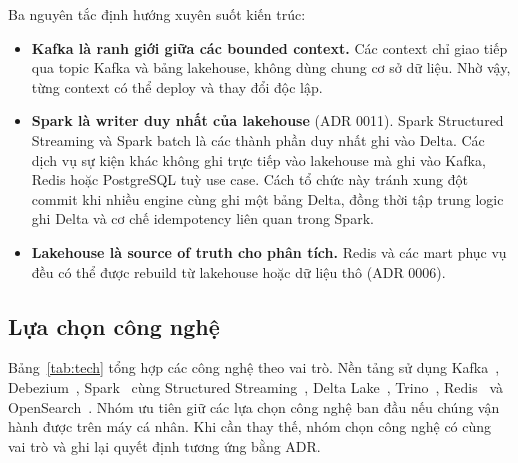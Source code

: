 Ba nguyên tắc định hướng xuyên suốt kiến trúc:
\begin{itemize}
  \item \textbf{Kafka là ranh giới giữa các bounded context.} Các context chỉ giao tiếp qua topic Kafka và bảng lakehouse, không dùng chung cơ sở dữ liệu. Nhờ vậy, từng context có thể deploy và thay đổi độc lập.
  \item \textbf{Spark là writer duy nhất của lakehouse} (ADR 0011). Spark Structured Streaming và Spark batch là các thành phần duy nhất ghi vào Delta. Các dịch vụ sự kiện khác không ghi trực tiếp vào lakehouse mà ghi vào Kafka, Redis hoặc PostgreSQL tuỳ use case. Cách tổ chức này tránh xung đột commit khi nhiều engine cùng ghi một bảng Delta, đồng thời tập trung logic ghi Delta và cơ chế idempotency liên quan trong Spark.
  \item \textbf{Lakehouse là source of truth cho phân tích.} Redis và các mart phục vụ đều có thể được rebuild từ lakehouse hoặc dữ liệu thô (ADR 0006).
\end{itemize}

\subsection{Lựa chọn công nghệ}

Bảng~\ref{tab:tech} tổng hợp các công nghệ theo vai trò. Nền tảng sử dụng Kafka~\cite{kreps2011kafka}, Debezium~\cite{debezium}, Spark~\cite{zaharia2016spark} cùng Structured Streaming~\cite{armbrust2018structured}, Delta Lake~\cite{armbrust2020delta}, Trino~\cite{sethi2019presto}, Redis~\cite{redis} và OpenSearch~\cite{opensearch}. Nhóm ưu tiên giữ các lựa chọn công nghệ ban đầu nếu chúng vận hành được trên máy cá nhân. Khi cần thay thế, nhóm chọn công nghệ có cùng vai trò và ghi lại quyết định tương ứng bằng ADR.

